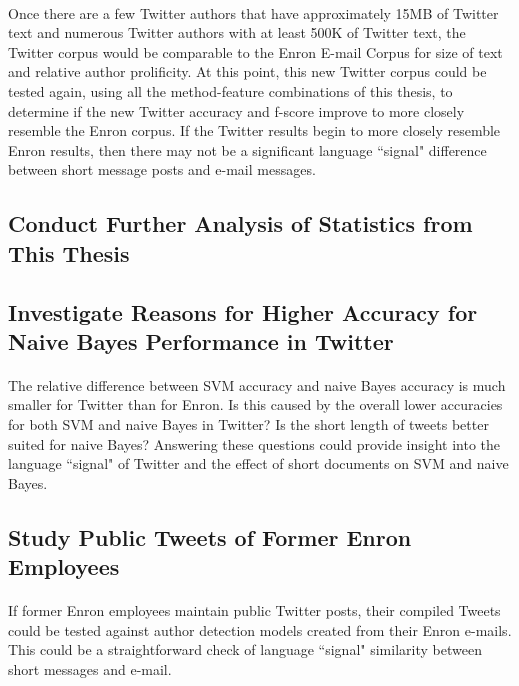		\paragraph*{} Once there are a few Twitter authors that have approximately 15MB of Twitter text and numerous Twitter authors with at least 500K of Twitter text, the Twitter corpus would be comparable to the Enron E-mail Corpus for size of text and relative author prolificity.  At this point, this new Twitter corpus could be tested again, using all the method-feature combinations of this thesis, to determine if the new Twitter accuracy and f-score improve to more closely resemble the Enron corpus.  If the Twitter results begin to more closely resemble Enron results, then there may not be a significant language ``signal" difference between short message posts and e-mail messages.

\begin{singlespace}
\section{Conduct Further Analysis of Statistics from This Thesis}
\end{singlespace}
	\begin{singlespace}
	\subsection{Investigate Reasons for Higher Accuracy for Naive Bayes Performance in Twitter}
	\end{singlespace}
	\paragraph*{} The relative difference between SVM accuracy and naive Bayes accuracy is much smaller for Twitter than for Enron.  Is this caused by the overall lower accuracies for both SVM and naive Bayes in Twitter?  Is the short length of tweets better suited for naive Bayes?  Answering these questions could provide insight into the language ``signal" of Twitter and the effect of short documents on SVM and naive Bayes.

	\subsection{Study Public Tweets of Former Enron Employees}
	\paragraph*{} If former Enron employees maintain public Twitter posts, their compiled Tweets could be tested against author detection models created from their Enron e-mails.  This could be a straightforward check of language ``signal" similarity between short messages and e-mail.
